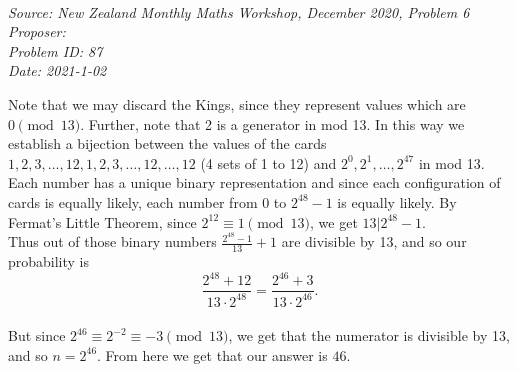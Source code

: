 \SSbreak\\
\emph{Source: New Zealand Monthly Maths Workshop, December 2020, Problem 6}\\
\emph{Proposer: \Pbrain}\\
\emph{Problem ID: 87}\\
\emph{Date: 2021-1-02}\\
\SSbreak

\bigskip

\begin{solution}\hfil\medskip
    
Note that we may discard the Kings, since they represent values which are \( 0 \pmod{13} \). Further, note that 2 is a generator in mod 13. In this way we establish a bijection between the values of the cards \( 1, 2, 3, \dots, 12, 1, 2, 3, \dots, 12, \dots, 12 \) (4 sets of 1 to 12) and \( 2^0, 2^1, \dots, 2^{47} \) in mod 13. \\
Each number has a unique binary representation and since each configuration of cards is equally likely, each number from 0 to \( 2^{48} -1 \) is equally likely. By Fermat's Little Theorem, since \( 2^{12} \equiv 1 \pmod{13}\), we get \( 13\vert 2^{48} - 1\). \\
Thus out of those binary numbers \( \frac{2^{48} - 1}{13} + 1 \) are divisible by 13, and so our probability is \[ \frac{2^{48} + 12}{13 \cdot 2^{48}} = \frac{2^{46} + 3}{13 \cdot 2^{46}} .\] \\
But since \(2^{46} \equiv 2^{-2} \equiv -3 \pmod{13}\), we get that the numerator is divisible by 13, and so \(n = 2^{46}\). From here we get that our answer is $\boxed{46}$. 


\end{solution}\bigskip
